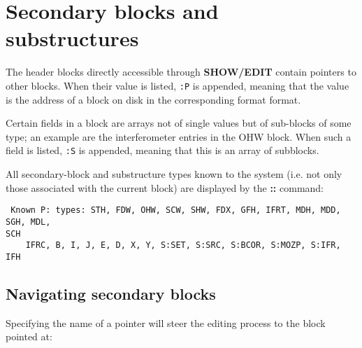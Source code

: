 \section{ Secondary blocks and substructures} 
\label{.pointers} 

	The header blocks directly accessible through {\bf SHOW/EDIT} contain
pointers to other blocks.  When their value is listed, \verb/:P/ is appended,
meaning that the value is the address of a block on disk in the corresponding
format format. 

	Certain fields in a block are arrays not of single values but of
sub-blocks of some type; an example are the interferometer entries in the OHW
block.  When such a field is listed, \verb/:S/ is appended, meaning that this
is an array of subblocks. 

	All secondary-block and substructure types known to the system 
(i.e.  not only those associated with the current block) are displayed by the
{\bf ::} command: 

\spbegin %
\suser{::} 
%
\svbegin \begin{verbatim} 
 Known P: types: STH, FDW, OHW, SCW, SHW, FDX, GFH, IFRT, MDH, MDD, SGH, MDL,
SCH 
	IFRC, B, I, J, E, D, X, Y, S:SET, S:SRC, S:BCOR, S:MOZP, S:IFR, IFH
\end{verbatim} 
\svend 
\spend %


\subsection{ Navigating secondary blocks} 

	Specifying the name of a pointer will steer the editing process to the
block pointed at: 

